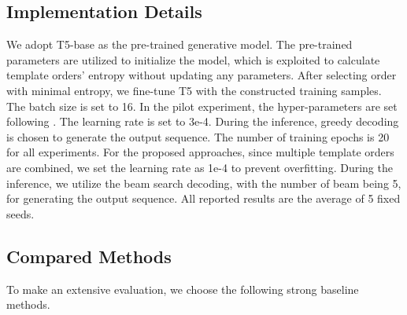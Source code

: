 \documentclass[11pt]{article}
\begin{document}
\begin{table}[]
\small
    \centering
    \caption{Data statistics. \#S, \#+, \#0, and \#- denote the number of sentences, the number of positive, neutral and negative quads respectively.}
    \label{table:data}
\end{table}

\subsection{Implementation Details}
We adopt T5-base \cite{JMLR:v21:20-074} as the pre-trained generative model. The pre-trained parameters are utilized to initialize the model, which is exploited to calculate template orders' entropy without updating any parameters. After selecting order with minimal entropy, we fine-tune T5 with the constructed training samples. The batch size is set to 16. In the pilot experiment, the hyper-parameters are set following \citet{zhang-etal-2021-aspect-sentiment}. The learning rate is set to 3e-4. During the inference, greedy decoding is chosen to generate the output sequence. The number of training epochs is 20 for all experiments. For the proposed approaches, since multiple template orders are combined, we set the learning rate as 1e-4 to prevent overfitting. During the inference, we utilize the beam search decoding, with the number of beam being 5, for generating the output sequence. All reported results are the average of 5 fixed seeds.  



\subsection{Compared Methods}
To make an extensive evaluation, we choose the following strong baseline methods.
\end{document}
